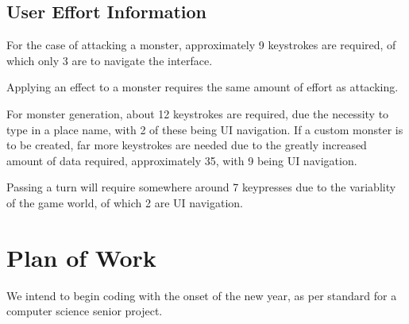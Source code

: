 \documentclass[letterpaper,12pt]{article}
\begin{document}
\subsection{User Effort Information}
For the case of attacking a monster, approximately 9 keystrokes are
required, of which only 3 are to navigate the interface.

Applying an effect to a monster requires the same amount of effort as
attacking.

For monster generation, about 12 keystrokes are required, due the
necessity to type in a place name, with 2 of these being UI
navigation. If a custom monster is to be created, far more keystrokes
are needed due to the greatly increased amount of data required,
approximately 35, with 9 being UI navigation.

Passing a turn will require somewhere around 7 keypresses due to the
variablity of the game world, of which 2 are UI navigation.
\pagebreak
\section{Plan of Work}
We intend to begin coding with the onset of the new year, as per
standard for a computer science senior project. 
\end{document}
